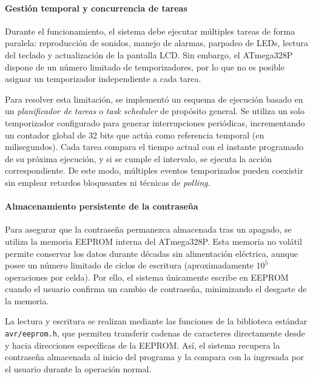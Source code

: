 \vspace{1em}

\paragraph*{Gestión temporal y concurrencia de tareas}

Durante el funcionamiento, el sistema debe ejecutar múltiples tareas de forma paralela: reproducción de sonidos, manejo de alarmas, parpadeo de LEDs, lectura del teclado y actualización de la pantalla LCD. Sin embargo, el ATmega328P dispone de un número limitado de temporizadores, por lo que no es posible asignar un temporizador independiente a cada tarea.

Para resolver esta limitación, se implementó un esquema de ejecución basado en un \textit{planificador de tareas} o \textit{task scheduler} de propósito general. Se utiliza un solo temporizador configurado para generar interrupciones periódicas, incrementando un contador global de 32 bits que actúa como referencia temporal (en milisegundos). Cada tarea compara el tiempo actual con el instante programado de su próxima ejecución, y si se cumple el intervalo, se ejecuta la acción correspondiente. De este modo, múltiples eventos temporizados pueden coexistir sin emplear retardos bloqueantes ni técnicas de \textit{polling}.

\vspace{1em}

\paragraph*{Almacenamiento persistente de la contraseña}

Para asegurar que la contraseña permanezca almacenada tras un apagado, se utiliza la memoria EEPROM interna del ATmega328P. Esta memoria no volátil permite conservar los datos durante décadas sin alimentación eléctrica, aunque posee un número limitado de ciclos de escritura (aproximadamente $10^5$ operaciones por celda). Por ello, el sistema únicamente escribe en EEPROM cuando el usuario confirma un cambio de contraseña, minimizando el desgaste de la memoria.

La lectura y escritura se realizan mediante las funciones de la biblioteca estándar \texttt{avr/eeprom.h}, que permiten transferir cadenas de caracteres directamente desde y hacia direcciones específicas de la EEPROM. Así, el sistema recupera la contraseña almacenada al inicio del programa y la compara con la ingresada por el usuario durante la operación normal.

